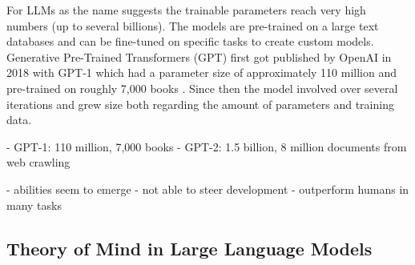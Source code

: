 For LLMs as the name suggests the trainable parameters reach very high numbers (up to several billions). The models are pre-trained on a large text databases and can be fine-tuned on specific tasks to create custom models. Generative Pre-Trained Transformers (GPT) first got published by OpenAI in 2018 with GPT-1 which had a parameter size of approximately 110 million and pre-trained on roughly 7,000 books \cite{gpt1}. Since then the model involved over several iterations and grew size both regarding the amount of parameters and training data. 

- GPT-1: 110 million, 7,000 books
- GPT-2: 1.5 billion, 8 million documents from web crawling

- abilities seem to emerge
- not able to steer development
- outperform humans in many tasks
\subsection{Theory of Mind in Large Language Models}